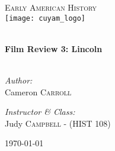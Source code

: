 \begin{titlepage}
\begin{center}

\textsc{\Large Early American History}\\[0.5cm]
\texttt{[image: cuyam\_logo]}

\HRule \\[0.4cm]
{ \LARGE \bfseries Film Review 3: Lincoln}\\[0.5cm]

\HRule \\[1.5cm]

\begin{minipage}{0.4\textwidth}
\begin{flushleft} \large
\emph{Author:}\\
Cameron \textsc{Carroll}
\end{flushleft}
\end{minipage}
\begin{minipage}{0.4\textwidth}
\begin{flushright} \large
\emph{Instructor \& Class:}\\
Judy \textsc{Campbell} - (HIST 108)
\end{flushright}
\end{minipage}

\vfill

{\large \today}

\end{center}
\end{titlepage}